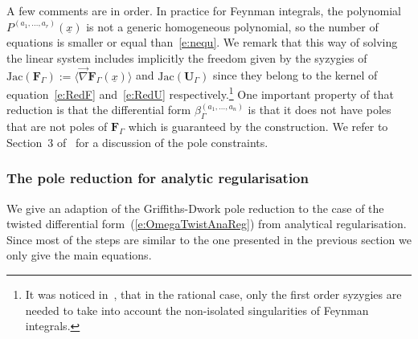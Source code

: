 \documentclass[a4paper,12pt]{article}
\numberwithin{equation}{section}
\numberwithin{figure}{section}
\begin{document}
A few comments are in order. In practice for Feynman integrals,   the polynomial $ P^{(a_1,\dots,a_r)}(\underline x)$ is not a generic
homogeneous polynomial, so the number of equations is smaller or equal than~\eqref{e:nequ}.
%
We remark that this way of solving the linear system includes implicitly the
freedom given by the syzygies of $\textrm{Jac}(\textbf{F}_\Gamma)
 :=\langle \vec\nabla \textbf{F}_\Gamma(\underline x)\rangle$ and
$\textrm{Jac}(\textbf{U}_\Gamma)$ since they belong to
the kernel of equation~\eqref{e:RedF} and~\eqref{e:RedU}
respectively.\footnote{It was noticed in~\cite{Lairez:2022zkj},  that in
  the rational case, only the first order syzygies are needed to take
  into account the non-isolated singularities of Feynman integrals.}
%
%
%
One important property of that reduction is that the differential form $\beta_\Gamma^{(a_1,\dots,a_n)}$ is that it
does not have poles that are not poles of $\textbf{F}_\Gamma$ which is
guaranteed by the construction. We refer
to Section~3 of~\cite{Lairez:2022zkj} for a discussion of the pole constraints.
%
%
  \subsubsection{The pole reduction for analytic
    regularisation}\label{sec:PoleRedAn}
We give an adaption of the Griffiths-Dwork pole reduction to the case
of the twisted differential form~(\ref{e:OmegaTwistAnaReg})  from
analytical regularisation. Since most of the steps are similar to the
one presented in the previous section we only give the main equations.
\end{document}
